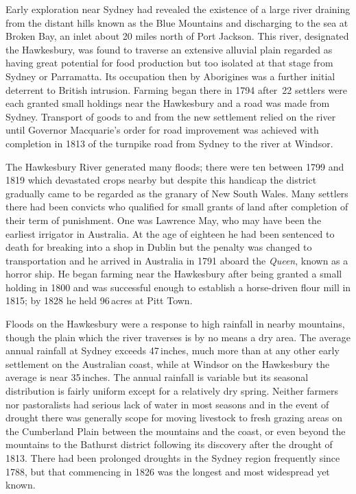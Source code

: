 Early exploration near Sydney had revealed the existence of a large
river draining from the distant hills known as the Blue Mountains and
discharging to the sea at Broken Bay, an inlet about 20 miles north of
Port Jackson.  This river, designated the
Hawkesbury, was found to traverse an extensive
alluvial plain regarded as having great potential for food production
but too isolated at that stage from Sydney or Parramatta.  Its
occupation then by Aborigines was a further initial deterrent to
British intrusion.  Farming began there in 1794 after~22 settlers were
each granted small holdings near the Hawkesbury and a road was made
from Sydney. Transport of goods to and from the new settlement relied
on the river until Governor Macquarie's
order for road improvement was achieved with completion in 1813 of the
turnpike road from Sydney to the river at Windsor.

The Hawkesbury River generated many floods; there were ten between
1799 and 1819 which devastated crops nearby but despite this handicap
the district gradually came to be regarded as the granary of New South
Wales. Many settlers there had been convicts who qualified for small
grants of land after completion of their term of punishment. One was
Lawrence May, who may have been the earliest irrigator
in Australia. At the age of eighteen he had been sentenced to death
for breaking into a shop in Dublin but the penalty was changed to
transportation and he arrived in Australia in 1791 aboard the
\textsl{Queen}, known as a horror ship. He began farming near the
Hawkesbury after being granted a small holding in 1800 and was
successful enough to establish a horse-driven flour mill in 1815; by
1828 he held 96\,acres at Pitt Town.

Floods on the Hawkesbury were a response to high rainfall in nearby
mountains, though the plain which the river traverses is by no means a
dry area.  The average annual rainfall at Sydney exceeds 47\,inches,
much more than at any other early settlement on the Australian coast,
while at Windsor  on the Hawkesbury the average is
near 35\,inches. The annual rainfall is variable but its seasonal
distribution is fairly uniform except for a relatively dry spring.
Neither farmers nor pastoralists had serious lack of water in most
seasons and in the event of drought there was generally scope for
moving livestock to fresh grazing areas on the Cumberland Plain
between the mountains and the coast, or even beyond the mountains to
the Bathurst district following its discovery after the drought of
1813.  There had been prolonged droughts in the Sydney region
frequently since 1788, but that commencing in 1826 was the longest and
most widespread yet known.

